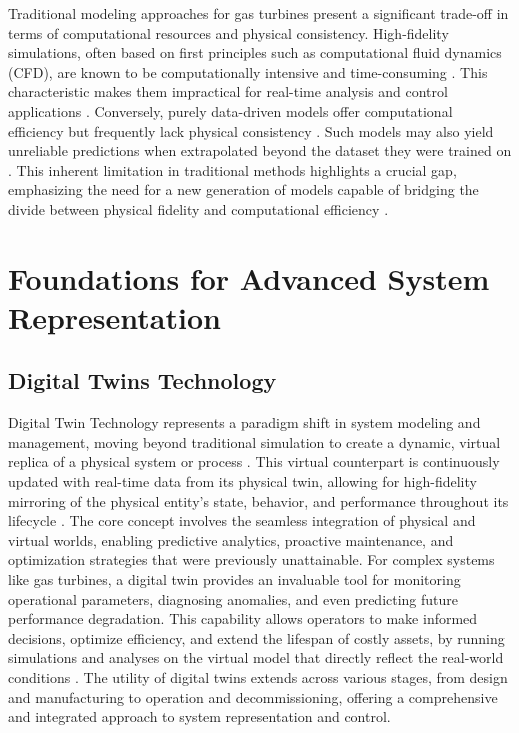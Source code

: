 \documentclass[
  12pt,
  oneside,
  a4paper,
  english,
  brazil]{abntex2}
\begin{document}
Traditional modeling approaches for gas turbines present a significant
trade-off in terms of computational resources and physical consistency.
High-fidelity simulations, often based on first principles such as
computational fluid dynamics (CFD), are known to be computationally
intensive and time-consuming \citet{verstraete2010cfd}. This
characteristic makes them impractical for real-time analysis and control
applications \citet{verstraete2010cfd}. Conversely, purely data-driven
models offer computational efficiency but frequently lack physical
consistency \citet{gurney2010gasturbine}. Such models may also yield
unreliable predictions when extrapolated beyond the dataset they were
trained on \citet{gurney2010gasturbine}. This inherent limitation in
traditional methods highlights a crucial gap, emphasizing the need for a
new generation of models capable of bridging the divide between physical
fidelity and computational efficiency \citet{kurz2009gasturbine}.

\section{\texorpdfstring{\textbf{Foundations for Advanced System Representation}}{}}\label{section-1}

\subsection{Digital Twins Technology}\label{digital-twins-technology}

Digital Twin Technology represents a paradigm shift in system modeling
and management, moving beyond traditional simulation to create a
dynamic, virtual replica of a physical system or process
\citet{grieves2011digital}. This virtual counterpart is continuously
updated with real-time data from its physical twin, allowing for
high-fidelity mirroring of the physical entity's state, behavior, and
performance throughout its lifecycle \citet{tao2019digital}. The core
concept involves the seamless integration of physical and virtual
worlds, enabling predictive analytics, proactive maintenance, and
optimization strategies that were previously unattainable. For complex
systems like gas turbines, a digital twin provides an invaluable tool
for monitoring operational parameters, diagnosing anomalies, and even
predicting future performance degradation. This capability allows
operators to make informed decisions, optimize efficiency, and extend
the lifespan of costly assets, by running simulations and analyses on
the virtual model that directly reflect the real-world conditions
\citet{schluse2018digital}. The utility of digital twins extends across
various stages, from design and manufacturing to operation and
decommissioning, offering a comprehensive and integrated approach to
system representation and control.
\end{document}
